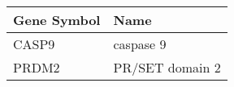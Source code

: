 \begin{tabular}{ll}
\toprule
Gene Symbol &            Name \\
\midrule
      CASP9 &       caspase 9 \\
      PRDM2 & PR/SET domain 2 \\
\bottomrule
\end{tabular}
